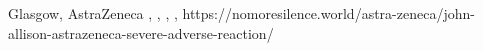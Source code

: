           {Glasgow, }
          {}
          {AstraZeneca}
          {}
          {,
           ,
           ,
           ,
          }
          {https://nomoresilence.world/astra-zeneca/john-allison-astrazeneca-severe-adverse-reaction/}
